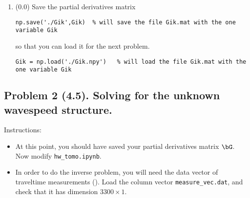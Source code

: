 \documentclass[11pt,titlepage,fleqn]{article}
\newcommand{\tfiletomo}{{\tt hw\_tomo.ipynb}}
\begin{document}
\begin{enumerate}

\item (0.0) Save the partial derivatives matrix
%
\begin{verbatim}
np.save('./Gik',Gik)  % will save the file Gik.mat with the one variable Gik
\end{verbatim}
%
so that you can load it for the next problem.
%
\begin{verbatim}
Gik = np.load('./Gik.npy')   % will load the file Gik.mat with the one variable Gik
\end{verbatim}

\end{enumerate}


\pagebreak
\subsection*{Problem 2 (4.5). Solving for the unknown wavespeed structure.}

Instructions:
%
\begin{itemize}
\item At this point, you should have saved your partial derivatives matrix $\bG$. \\ Now modify \tfiletomo.

\item In order to do the inverse problem, you will need the data vector of traveltime measurements (). Load the column vector \verb+measure_vec.dat+, and check that it has dimension \mbox{$3300 \times 1$}.

\end{itemize}
\end{document}
